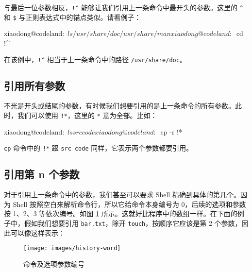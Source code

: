 \documentclass[]{ctexbook}
\newenvironment{Shaded}{\begin{snugshade}}{\end{snugshade}}
\newcommand{\ExtensionTok}[1]{#1}
\newcommand{\NormalTok}[1]{#1}
\begin{document}
与最后一位参数相反，\texttt{!\^{}} 能够让我们引用上一条命令中最开头的参数。这里的 \texttt{\^{}} 和 \texttt{\$} 与正则表达式中的锚点类似。请看例子：

\begin{Shaded}
\begin{Highlighting}[]
\ExtensionTok{xiaodong@codeland}\NormalTok{:~$ ls /usr/share/doc /usr/share/man}
\ExtensionTok{xiaodong@codeland}\NormalTok{:~$ cd !^}
\end{Highlighting}
\end{Shaded}

在该例中，\texttt{!\^{}} 相当于上一条命令中的路径 \texttt{/usr/share/doc}。

\hypertarget{ux5f15ux7528ux6240ux6709ux53c2ux6570}{%
\subsection{引用所有参数}\label{ux5f15ux7528ux6240ux6709ux53c2ux6570}}

不光是开头或结尾的参数，有时候我们想要引用的是上一条命令的所有参数。此时，我们可以使用 \texttt{!*}，这里的 \texttt{*} 意为全部。比如：

\begin{Shaded}
\begin{Highlighting}[]
\ExtensionTok{xiaodong@codeland}\NormalTok{:~$ ls src code}
\ExtensionTok{xiaodong@codeland}\NormalTok{:~$ cp -r !*}
\end{Highlighting}
\end{Shaded}

\texttt{cp} 命令中的 \texttt{!*} 跟 \texttt{src\ code} 同样，它表示两个参数都要引用。

\hypertarget{ux5f15ux7528ux7b2c-n-ux4e2aux53c2ux6570}{%
\subsection{引用第 n 个参数}\label{ux5f15ux7528ux7b2c-n-ux4e2aux53c2ux6570}}

对于引用上一条命令中的参数，我们甚至可以要求 Shell 精确到具体的第几个。因为 Shell 按照空白来解析命令行，所以它给命令本身编号为 0，后续的选项和参数按 1、2、3 等依次编号。如图 \ref{fig:history-word} 所示。这就好比程序中的数组一样。在下面的例子中，假如我们想要引用 \texttt{bar.txt}，除开 \texttt{touch}，按顺序它应该是第 2 个参数，因此可以像这样表示：

\begin{figure}
\texttt{[image: images/history-word]} \caption{命令及选项参数编号}\label{fig:history-word}
\end{figure}
\end{document}

